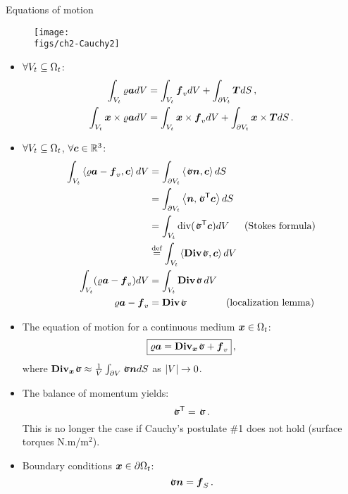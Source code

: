 \begin{frame}{Equations of motion}{}

\begin{overprint}

\begin{figure}
\centering\texttt{[image: \\figs/ch2-Cauchy2]}
\end{figure}
\begin{itemize}
\item $\forall V_t\subseteq\Omega_t$:
\begin{displaymath}
\begin{split}
\int_{V_t}\varrho{\boldsymbol{a}}d V &=\int_{V_t}{\boldsymbol{f}}_vd V + \int_{\partial V_t}{\boldsymbol{T}}d S\,, \\
\int_{V_t}{\boldsymbol{x}}\times\varrho{\boldsymbol{a}}d V &=\int_{V_t}{\boldsymbol{x}}\times{\boldsymbol{f}}_vd V + \int_{\partial V_t}{\boldsymbol{x}}\times{\boldsymbol{T}}d S\,.
\end{split}
\end{displaymath}
\end{itemize}

\begin{itemize}
\item $\forall V_t\subseteq\Omega_t$, $\forall{\boldsymbol{c}}\in\mathbb{R}^3$:
\begin{displaymath}
\begin{split}
\int_{V_t}\scal{\roi\acv-\fv_v,\cv}\id V &=\int_{\partial V_t}\scal{\stress\nv,\cv}\id S \\
&=\int_{\partial V_t}\scal{\nv,\stress^\itr\cv}\id S \\
&=\int_{V_t}\div(\stress^\itr\cv)\id V\quad\;\;(\text{Stokes formula}) \\
&\overset{\text{def}}{=}\int_{V_t}\scal{\Div\stress,\cv}\id V \\
\int_{V_t}(\roi\acv-\fv_v)\id V &=\int_{V_t}\Div\stress\,\id V \\
\roi\acv-\fv_v &=\Div\stress\quad\quad\quad\quad(\text{localization lemma})
\end{split}
\end{displaymath}
\end{itemize}

\begin{itemize}
\item The equation of motion for a continuous medium ${\boldsymbol{x}}\in\Omega_t$:
\begin{displaymath}
\boxed{\roi\acv=\Divx\stress+\fv_v}\,,
\end{displaymath}
where $\Divx\stress\approx\frac{1}{V}\int_{\partial V}\stress\nv\id S$ as $\left|V\right|\to 0$.
\item The balance of momentum yields:
\begin{displaymath}
\stress^\itr=\stress\,.
\end{displaymath}
This is no longer the case if Cauchy's postulate \#1 does not hold (surface torques N.m/m$^2$).
\item Boundary conditions ${\boldsymbol{x}}\in\partial \Omega_t$:
\begin{displaymath}
\stress\nv=\fv_S\,.
\end{displaymath}


\end{itemize}
\end{overprint}
\end{frame}
